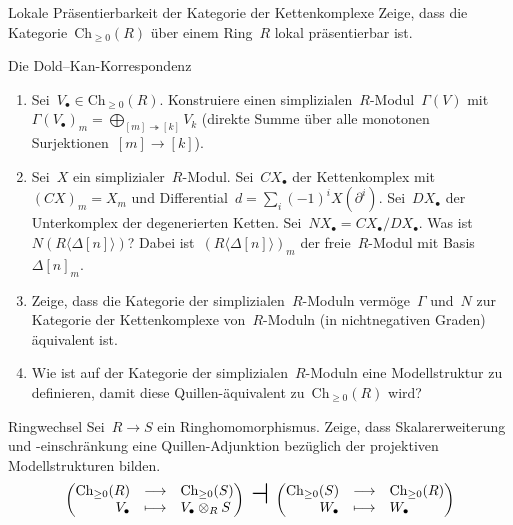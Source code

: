 \documentclass{uebblatt}
\newcommand{\Ch}{\mathrm{Ch}}
\begin{document}

\begin{aufgabe}{Lokale Präsentierbarkeit der Kategorie der Kettenkomplexe}
Zeige, dass die Kategorie~$\Ch_{\geq0}(R)$ über einem Ring~$R$ lokal
präsentierbar ist.
\end{aufgabe}

\begin{aufgabe}{Die Dold--Kan-Korrespondenz}
\begin{enumerate}
\item Sei~$V_\bullet \in \Ch_{\geq0}(R)$. Konstruiere einen
simplizialen~$R$-Modul~$\Gamma(V)$ mit~$\Gamma(V_\bullet)_m = \bigoplus_{[m]
\twoheadrightarrow [k]} V_k$ (direkte Summe über alle monotonen
Surjektionen~$[m] \to [k]$).
\item Sei~$X$ ein simplizialer~$R$-Modul. Sei~$CX_\bullet$ der Kettenkomplex
mit~$(CX)_m = X_m$ und Differential~$d = \sum_i (-1)^i X(\partial^i)$.
Sei~$DX_\bullet$ der Unterkomplex der degenerierten Ketten. Sei~$NX_\bullet =
CX_\bullet/DX_\bullet$. Was ist~$N(R\langle\Delta[n]\rangle)$? Dabei
ist~$(R\langle\Delta[n]\rangle)_m$ der freie~$R$-Modul mit Basis~$\Delta[n]_m$.
\item Zeige, dass die Kategorie der simplizialen~$R$-Moduln vermöge~$\Gamma$
und~$N$ zur Kategorie der Kettenkomplexe von~$R$-Moduln (in nichtnegativen
Graden) äquivalent ist.
\item Wie ist auf der Kategorie der simplizialen~$R$-Moduln eine
Modellstruktur zu definieren, damit diese Quillen-äquivalent
zu~$\Ch_{\geq0}(R)$ wird?
\end{enumerate}
\end{aufgabe}

\begin{aufgabe}{Ringwechsel}
Sei~$R \to S$ ein Ringhomomorphismus. Zeige, dass
Skalarerweiterung und -einschränkung eine Quillen-Adjunktion bezüglich der
projektiven Modellstrukturen bilden.
\[ \left(\begin{array}{@{}rcl@{}}
  \Ch_{\geq0}(R) &\longrightarrow& \Ch_{\geq0}(S) \\
  V_\bullet &\longmapsto& V_\bullet \otimes_R S
\end{array}\right)\ \text{\huge$\dashv$}\ \left(\begin{array}{@{}rcl@{}}
  \Ch_{\geq0}(S) &\longrightarrow& \Ch_{\geq0}(R) \\
  W_\bullet &\longmapsto& W_\bullet
\end{array}\right) \]
\vspace{-1em}
\end{aufgabe}
\end{document}
